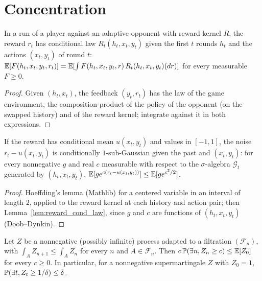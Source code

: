 \chapter{Concentration}
\label{chap:prereq_concentration}

\begin{lemma}
  \label{lem:reward_cond_law}
  \leanok
  In a run of a player against an adaptive opponent with reward kernel $R$, the reward $r_t$ has
  conditional law $R_t(h_t, x_t, y_t)$ given the first $t$ rounds $h_t$ and the actions $(x_t, y_t)$
  of round $t$: $\mathbb{E}[F(h_t, x_t, y_t, r_t)] = \mathbb{E}[\int F(h_t, x_t, y_t, r)\, R_t(h_t, x_t, y_t)(dr)]$
  for every measurable $F \ge 0$.
\end{lemma}

\begin{proof}
  \leanok
  Given $(h_t, x_t)$, the feedback $(y_t, r_t)$ has the law of the game environment, the
  composition-product of the policy of the opponent (on the swapped history) and of the reward
  kernel; integrate against it in both expressions.
\end{proof}

\begin{lemma}
  \label{lem:bounded_noise_subgaussian}
  \leanok
  If the reward has conditional mean $u(x_t, y_t)$ and values in $[-1, 1]$, the noise
  $r_t - u(x_t, y_t)$ is conditionally $1$-sub-Gaussian given the past and $(x_t, y_t)$: for every
  nonnegative $g$ and real $c$ measurable with respect to the $\sigma$-algebra $\mathcal G_t$
  generated by $(h_t, x_t, y_t)$, $\mathbb{E}[g e^{c (r_t - u(x_t, y_t))}] \le \mathbb{E}[g e^{c^2/2}]$.
\end{lemma}

\begin{proof}
  \leanok
  Hoeffding's lemma (Mathlib) for a centered variable in an interval of length $2$, applied to the
  reward kernel at each history and action pair; then Lemma~\ref{lem:reward_cond_law}, since $g$
  and $c$ are functions of $(h_t, x_t, y_t)$ (Doob--Dynkin).
\end{proof}

\begin{lemma}
  \label{lem:ville}
  \leanok
  Let $Z$ be a nonnegative (possibly infinite) process adapted to a filtration $(\mathcal F_n)$,
  with $\int_A Z_{n+1} \le \int_A Z_n$ for every $n$ and $A \in \mathcal F_n$. Then
  $c\, \mathbb{P}(\exists n, Z_n \ge c) \le \mathbb{E}[Z_0]$ for every $c \ge 0$. In particular, for a
  nonnegative supermartingale $Z$ with $Z_0 = 1$, $\mathbb{P}(\exists t, Z_t \ge 1/\delta) \le \delta$.
\end{lemma}

